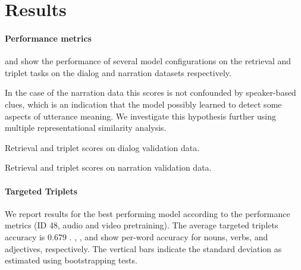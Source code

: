 \section{Results}
\label{sec:results}
\paragraph{Performance metrics}
 and  show
the performance of several model configurations on the retrieval and
triplet tasks on the dialog and narration datasets respectively.

In the case of the narration data this scores is not confounded by
speaker-based clues, which is an indication that the model possibly
learned to detect some aspects of utterance meaning. We investigate
this hypothesis further using multiple representational similarity
analysis.
 

 \begin{table}
   \centering
   
   \caption{Retrieval and triplet scores on dialog validation data.}
   \label{tab:scores-dialog}
 \end{table}

\begin{table}
   \centering
   
   \caption{Retrieval and triplet scores on narration validation data.}
   \label{tab:scores-narration}
 \end{table}
 
\paragraph{Targeted Triplets}

We report results for the best performing model according to the performance metrics (ID 48, audio and video pretraining). The average targeted triplets accuracy is 0.679 . ,  , and  show per-word accuracy for nouns, verbs, and adjectives, respectively. The vertical bars indicate the standard deviation as estimated using bootstrapping tests.


